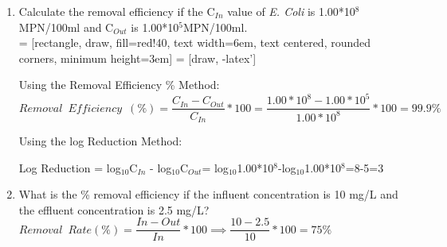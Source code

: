 \begin{enumerate}[1.]
\item Calculate the removal efficiency if the C$_{In}$ value of \textit{E. Coli} is 1.00*10$^8$MPN/100ml and C$_{Out}$ is 1.00*10$^5$MPN/100ml.\\
\vspace{0.3cm}
 = [rectangle, draw, fill=red!40, 
    text width=6em, text centered, rounded corners, minimum height=3em]
 = [draw, -latex']
\begin{figure}[!h]
\centering
{}
\end{figure}

Using the Removal Efficiency \% Method:\\
\vspace{0.3cm}
$Removal \enspace Efficiency \enspace (\%) = \dfrac{C_{In}-C_{Out}}{ C_{In}}*100=\dfrac{1.00*10^8-1.00*10^5}{1.00*10^8}*100=99.9\%$

\vspace{0.3cm}
Using the log Reduction Method:\\
\vspace{0.3cm}

Log Reduction = log$_{10}$C$_{In}$ \hspace{0.2cm} - \hspace{0.2cm}log$_{10}$C$_{Out}$= log$_{10}$1.00*10$^8$-log$_{10}$1.00*10$^8$=8-5=3

\vspace{0.3cm}



\vspace{0.3cm}
\item What is the \% removal efficiency if the influent concentration is 10 mg/L and the effluent concentration is 2.5 mg/L?\\
\vspace{0.2cm}
$Removal \enspace Rate (\%) = \dfrac{In-Out}{In}*100 \implies \dfrac{10-2.5}{10}*100=\boxed{75\%}$
\end{enumerate}

